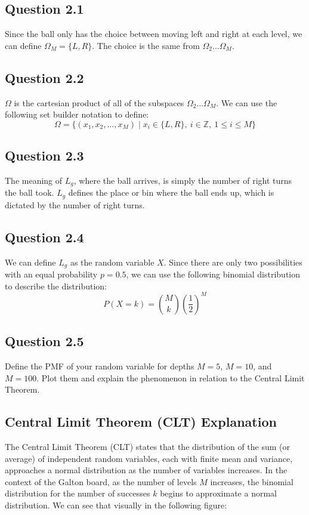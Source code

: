 \documentclass{article}
\begin{document}
\subsection{Question 2.1}
Since the ball only has the choice between moving left and right at each level, we can define $\Omega _M = \{L, R\}$. The choice is the same from $\Omega_2 \dots \Omega_M$.

\subsection{Question 2.2}
$\Omega$ is the cartesian product of all of the subspaces $\Omega_2 \dots \Omega_M$. We can use the following set builder notation to define: 
\[
\Omega = \{ (x_1, x_2, \dots, x_M) \mid x_i \in \{L, R\}, \ i \in \mathbb{Z}, \ 1 \leq i \leq M \}
\]

\subsection{Question 2.3}
The meaning of $L_g$, where the ball arrives, is simply the number of right turns the ball took. $L_g$ defines the place or bin where the ball ends up, which is dictated by the number of right turns.

\subsection{Question 2.4}
We can define $L_g$ as the random variable $X$. Since there are only two possibilities with an equal probability $p = 0.5$, we can use the following binomial distribution to describe the distribution:
\[
P(X = k) = \binom{M}{k} \left(\frac{1}{2}\right)^M
\]

\subsection{Question 2.5}
Define the PMF of your random variable for depths $M = 5$, $M = 10$, and $M = 100$. Plot them and explain the phenomenon in relation to the Central Limit Theorem.

\subsection{Central Limit Theorem (CLT) Explanation}
The Central Limit Theorem (CLT) states that the distribution of the sum (or average) of independent random variables, each with finite mean and variance, approaches a normal distribution as the number of variables increases. In the context of the Galton board, as the number of levels $M$ increases, the binomial distribution for the number of successes $k$ begins to approximate a normal distribution. We can see that visually in the following figure:
\end{document}
